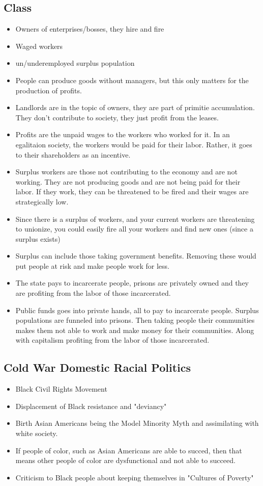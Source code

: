 \documentclass{article}
\begin{document}
\subsection{Class}
\begin{itemize}
  \item Owners of enterprises/bosses, they hire and fire
  \item Waged workers
  \item un/underemployed surplus population
  \item People can produce goods without managers, but this
    only matters for the production of profits.
  \item Landlords are in the topic of owners, they are part of 
    primitie accumulation.
    They don't contribute to society, they just profit from the leases.
  \item Profits are the unpaid wages to the workers who worked for it.
    In an egalitaion society, the workers would be paid for their labor.
    Rather, it goes to their shareholders as an incentive.
  \item Surplus workers are those not contributing to the economy
    and are not working. They are not producing goods and are not
    being paid for their labor. If they work, they can be threatened to be
    fired and their wages are strategically low.
  \item Since there is a surplus of workers, and your current workers are threatening to unionize,
    you could easily fire all your workers and find new ones (since a surplus exists)
  \item Surplus can include those taking government benefits. Removing these would put
    people at risk and make people work for less.
  \item The state pays to incarcerate people, prisons are privately owned
    and they are profiting from the labor of those incarcerated.
  \item Public funds goes into private hands, all to pay to incarcerate people.
    Surplus populations are funneled into prisons.
    Then taking people their communities makes them not able to work
    and make money for their communities. Along with
    capitalism profiting from the labor of those incarcerated.
\end{itemize}


\subsection{Cold War Domestic Racial Politics}
\begin{itemize}
  \item Black Civil Rights Movement
  \item Displacement of Black resistance and "deviancy"
  \item Birth Asian Americans being the Model Minority Myth and assimilating
    with white society.
  \item If people of color, such as Asian Americans are able to succed, then that means
    other people of color are dysfunctional and not able to succeed.
  \item Criticism to Black people about keeping themselves in "Cultures of Poverty"
\end{itemize}
\end{document}
